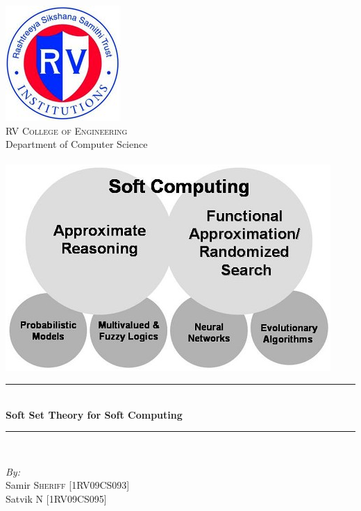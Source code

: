 \documentclass[12pt]{article} %
\date{}
\title{}
\newcommand{\HRule}{\rule{\linewidth}{0.5mm}}
\begin{document}
\maketitle
\begin{titlepage}

\begin{center}


\includegraphics[scale=0.75]{RVCE.png}\\[1cm]    

\textsc{\LARGE  RV College of Engineering}\\[0.5cm]
\large{Department of Computer Science}\\[1cm]
\textsc{\Large }\\[0.5cm]

\includegraphics[scale=1]{softee.png}\\[1cm]    

\HRule \\[0.4cm]
{  \huge\bfseries Soft Set Theory for Soft Computing }\\[0.4cm]

\HRule \\[1cm]

\begin{minipage}{0.8\textwidth}
\begin{flushleft} \large
\emph{By:}\\
Samir \textsc{Sheriff} [1RV09CS093]\\
Satvik \textsc{N} [1RV09CS095]\\


\end{flushleft}
\end{minipage}
\vfill

{\large}

\end{center}

\end{titlepage}
\end{document}

